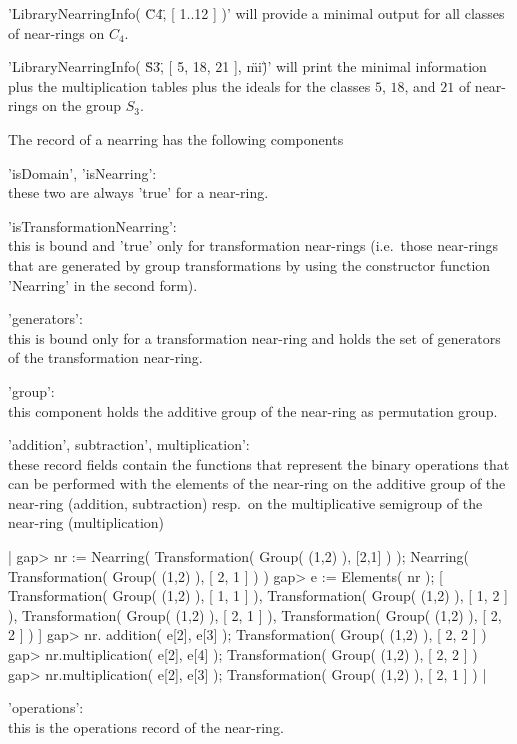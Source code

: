 'LibraryNearringInfo( \"C4\", [ 1..12 ] )' will provide a minimal output
for all classes of near-\-rings on $C_4$.

'LibraryNearringInfo( \"S3\", [ 5, 18, 21 ], \"mi\" )' will print
the minimal information plus the multiplication tables plus the ideals for
the classes $5$, $18$, and $21$ of near-rings on the group $S_3$.

   
The record of a nearring has the following components\:\
 
'isDomain', 'isNearring': \\ 
  these two are always 'true' for a near-ring.
  
'isTransformationNearring': \\ 
  this is bound and 'true' only for transformation near-rings (i.e.\ 
  those near-rings that are generated by group transformations by using
  the constructor function 'Nearring' in the second form).

'generators': \\ 
  this is bound only for a transformation near-ring and holds the set of 
  generators of the transformation near-ring.

'group': \\
  this component holds the additive group of the near-ring as permutation
  group.

'addition', subtraction', multiplication': \\ 
  these record fields contain the functions that represent the binary 
  operations that can be performed with the elements of the near-ring on the 
  additive group of the  
  near-ring (addition, subtraction) resp.\ on the multiplicative
  semigroup of the near-ring (multiplication)

|  gap> nr := Nearring( Transformation( Group( (1,2) ), [2,1] ) );
  Nearring( Transformation( Group( (1,2) ), [ 2, 1 ] ) ) 
  gap> e := Elements( nr );
  [ Transformation( Group( (1,2) ), [ 1, 1 ] ), 
    Transformation( Group( (1,2) ), [ 1, 2 ] ), 
    Transformation( Group( (1,2) ), [ 2, 1 ] ), 
    Transformation( Group( (1,2) ), [ 2, 2 ] ) ]
  gap> nr. addition( e[2], e[3] );
  Transformation( Group( (1,2) ), [ 2, 2 ] )
  gap> nr.multiplication( e[2], e[4] );
  Transformation( Group( (1,2) ), [ 2, 2 ] )
  gap> nr.multiplication( e[2], e[3] );
  Transformation( Group( (1,2) ), [ 2, 1 ] )
|

'operations': \\ 
  this is the operations record of the near-ring.

